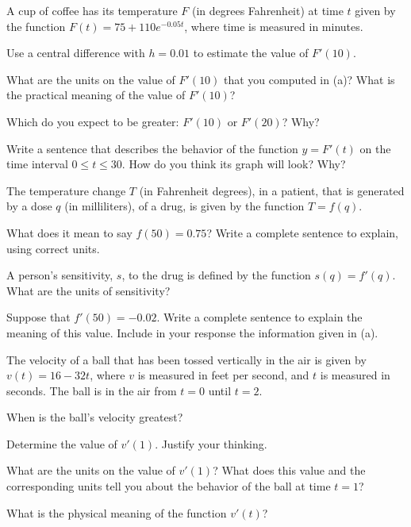\begin{exercises} 
\item A cup of coffee has its temperature $F$ (in degrees Fahrenheit) at time $t$ given by the function $F(t) = 75 + 110 e^{-0.05t}$, where time is measured in minutes.
	\ba
		\item Use a central difference with $h = 0.01$ to estimate the value of $F'(10)$.
		\item What are the units on the value of $F'(10)$ that you computed in (a)?  What is the practical meaning of the value of $F'(10)$?
		\item Which do you expect to be greater: $F'(10)$ or $F'(20)$?  Why?  
		\item Write a sentence that describes the behavior of the function $y = F'(t)$ on the time interval $0 \le t \le 30$.  How do you think its graph will look?  Why?
	\ea
\item The temperature change $T$ (in Fahrenheit degrees), in a patient, that is generated by a dose $q$ (in milliliters), of a drug, is given by the function $T = f(q)$.
\ba
	\item What does it mean to say $f(50) = 0.75$?  Write a complete sentence to explain, using correct units.
	\item A person's sensitivity, $s$, to the drug is defined by the function $s(q) = f'(q)$.  What are the units of sensitivity?
	\item Suppose that $f'(50) = -0.02$.  Write a complete sentence to explain the meaning of this value.  Include in your response the information given in (a).
\ea
\begin{exerciseSolution}
\end{exerciseSolution}
\item The velocity of a ball that has been tossed vertically in the air is given by $v(t) = 16 - 32t$, where $v$ is measured in feet per second, and $t$ is measured in seconds.  The ball is in the air from $t = 0$ until $t = 2$.
\ba
	\item When is the ball's velocity greatest?
	\item Determine the value of $v'(1)$.  Justify your thinking.
	\item What are the units on the value of $v'(1)$?  What does this value and the corresponding units tell you about the behavior of the ball at time $t = 1$?  
	\item What is the physical meaning of the function $v'(t)$?
\ea


\end{exercises}
